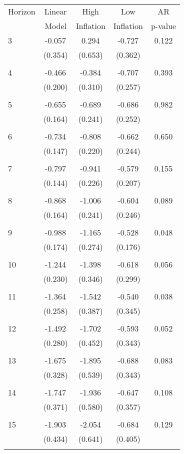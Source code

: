 \begin{tabular}{l*{1}{cccc}}
\hline\hline
 Horizon  & Linear & High                 & Low           & AR            \\
                  & Model         & Inflation & Inflation & p-value       \\
\hline
   3       & -0.057 & 0.294 & -0.727 & 0.122 \\
          & (0.354) & (0.653) & (0.362) & \\
 & & & &\\
   4       & -0.466 & -0.384 & -0.707 & 0.393 \\
          & (0.200) & (0.310) & (0.257) & \\
 & & & &\\
   5       & -0.655 & -0.689 & -0.686 & 0.982 \\
          & (0.164) & (0.241) & (0.252) & \\
 & & & &\\
   6       & -0.734 & -0.808 & -0.662 & 0.650 \\
          & (0.147) & (0.220) & (0.244) & \\
 & & & &\\
   7       & -0.797 & -0.941 & -0.579 & 0.155 \\
          & (0.144) & (0.226) & (0.207) & \\
 & & & &\\
   8       & -0.868 & -1.006 & -0.604 & 0.089 \\
          & (0.164) & (0.241) & (0.246) & \\
 & & & &\\
   9       & -0.988 & -1.165 & -0.528 & 0.048 \\
          & (0.174) & (0.274) & (0.176) & \\
 & & & &\\
  10       & -1.244 & -1.398 & -0.618 & 0.056 \\
          & (0.230) & (0.346) & (0.299) & \\
 & & & &\\
  11       & -1.364 & -1.542 & -0.540 & 0.038 \\
          & (0.258) & (0.387) & (0.345) & \\
 & & & &\\
  12       & -1.492 & -1.702 & -0.593 & 0.052 \\
          & (0.280) & (0.452) & (0.343) & \\
 & & & &\\
  13       & -1.675 & -1.895 & -0.688 & 0.083 \\
          & (0.328) & (0.539) & (0.343) & \\
 & & & &\\
  14       & -1.747 & -1.936 & -0.647 & 0.108 \\
          & (0.371) & (0.580) & (0.357) & \\
 & & & &\\
  15       & -1.903 & -2.054 & -0.684 & 0.129 \\
          & (0.434) & (0.641) & (0.405) & \\
 & & & &\\
\hline\hline
\end{tabular}
